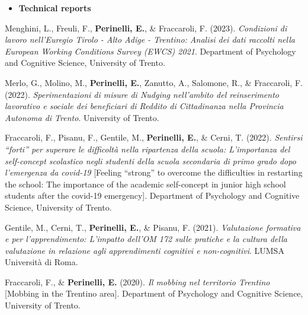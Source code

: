 \documentclass[hidelinks, letterpaper,10pt]{article} %
\begin{document}
\begin{itemize}
	\setlength{\topsep}{0pt}%
	\setlength{\leftmargin}{0.1in}%
	\setlength{\listparindent}{-0.1in}%
	\setlength{\itemindent}{-0.2in}%
	\setlength{\parsep}{\parskip}%
	
	\item {\textbf{\large{Technical reports}}}
\end{itemize}
\begin{etaremune}

	\item Menghini, L., Freuli, F., \textbf{Perinelli, E.}, \& Fraccaroli, F. (2023). \textit{Condizioni di lavoro nell’Euregio Tirolo - Alto Adige - Trentino: Analisi dei dati raccolti nella European Working Conditions Survey (EWCS) 2021}. Department of Psychology and Cognitive Science, University of Trento.

    \item Merlo, G., Molino, M., \textbf{Perinelli, E.}, Zanutto, A., Salomone, R., \& Fraccaroli, F. (2022). \textit{Sperimentazioni di misure di Nudging nell’ambito del reinserimento lavorativo e sociale dei beneficiari di Reddito di Cittadinanza nella Provincia Autonoma di Trento}. University of Trento.
    
    \item Fraccaroli, F., Pisanu, F., Gentile, M., \textbf{Perinelli, E.}, \& Cerni, T. (2022). \textit{Sentirsi ``forti'' per superare le difficoltà nella ripartenza della scuola: L’importanza del self-concept scolastico negli studenti della scuola secondaria di primo grado dopo l’emergenza da covid-19} [Feeling ``strong'' to overcome the difficulties in restarting the school: The importance of the academic self-concept in junior high school students after the covid-19 emergency]. Department of Psychology and Cognitive Science, University of Trento.
	
	\item Gentile, M., Cerni, T., \textbf{Perinelli, E.}, \& Pisanu, F. (2021). \textit{Valutazione formativa e per l’apprendimento: L’impatto dell’OM 172 sulle pratiche e la cultura della valutazione in relazione agli apprendimenti cognitivi e non-cognitivi}. LUMSA Università di Roma.
	
	\item Fraccaroli, F., \& \textbf{Perinelli, E.} (2020). \textit{Il mobbing nel territorio Trentino} [Mobbing in the Trentino area]. Department of Psychology and Cognitive Science, University of Trento. 

\end{etaremune}
\vspace{3mm}
\end{document}
